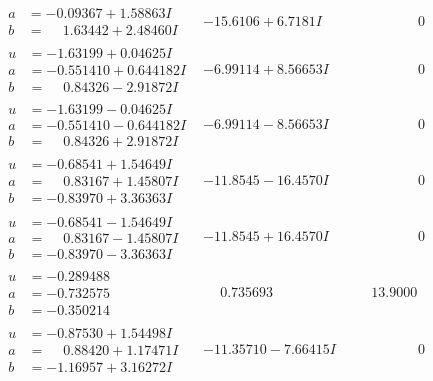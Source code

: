 \documentclass[1p]{elsarticle_modified}
\theoremstyle{definition}
\begin{document}
$$\begin{array}{c|c|c}
\begin{aligned}
a &= -0.09367 + 1.58863 I \\
b &= \phantom{-}1.63442 + 2.48460 I\end{aligned}
 & -15.6106 + 6.7181 I & \phantom{-0.000000 } 0 \\ \hline\begin{aligned}
u &= -1.63199 + 0.04625 I \\
a &= -0.551410 + 0.644182 I \\
b &= \phantom{-}0.84326 - 2.91872 I\end{aligned}
 & -6.99114 + 8.56653 I & \phantom{-0.000000 } 0 \\ \hline\begin{aligned}
u &= -1.63199 - 0.04625 I \\
a &= -0.551410 - 0.644182 I \\
b &= \phantom{-}0.84326 + 2.91872 I\end{aligned}
 & -6.99114 - 8.56653 I & \phantom{-0.000000 } 0 \\ \hline\begin{aligned}
u &= -0.68541 + 1.54649 I \\
a &= \phantom{-}0.83167 + 1.45807 I \\
b &= -0.83970 + 3.36363 I\end{aligned}
 & -11.8545 - 16.4570 I & \phantom{-0.000000 } 0 \\ \hline\begin{aligned}
u &= -0.68541 - 1.54649 I \\
a &= \phantom{-}0.83167 - 1.45807 I \\
b &= -0.83970 - 3.36363 I\end{aligned}
 & -11.8545 + 16.4570 I & \phantom{-0.000000 } 0 \\ \hline\begin{aligned}
u &= -0.289488\phantom{ +0.000000I} \\
a &= -0.732575\phantom{ +0.000000I} \\
b &= -0.350214\phantom{ +0.000000I}\end{aligned}
 & \phantom{-}0.735693\phantom{ +0.000000I} & \phantom{-}13.9000\phantom{ +0.000000I} \\ \hline\begin{aligned}
u &= -0.87530 + 1.54498 I \\
a &= \phantom{-}0.88420 + 1.17471 I \\
b &= -1.16957 + 3.16272 I\end{aligned}
 & -11.35710 - 7.66415 I & \phantom{-0.000000 } 0 \\ \hline\begin{aligned}

\end{aligned}
\end{array}$$
\end{document}
